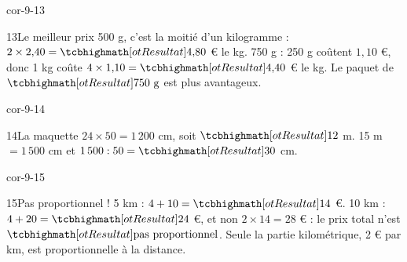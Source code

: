 \begin{blocLivre}{cor-9-13}\begin{corrige}{13}{Le meilleur prix}
500 g, c’est la moitié d’un kilogramme : $2\times2{,}40=\res{4{,}80}$ € le kg. 750 g : 250 g coûtent $1{,}10$ €, donc 1 kg coûte $4\times1{,}10=\res{4{,}40}$ € le kg. Le paquet de $\res{750\ \mathrm{g}}$ est plus avantageux.
\end{corrige}\end{blocLivre}
\begin{blocLivre}{cor-9-14}\begin{corrige}{14}{La maquette}
$24\times50=1\,200$ cm, soit $\res{12}$ m. 15 m $=1\,500$ cm et $1\,500:50=\res{30}$ cm.
\end{corrige}\end{blocLivre}
\begin{blocLivre}{cor-9-15}\begin{corrige}{15}{Pas proportionnel !}
5 km : $4+10=\res{14}$ €. 10 km : $4+20=\res{24}$ €, et non $2\times14=28$ € : le prix total n’est $\res{\text{pas proportionnel}}$. Seule la partie kilométrique, 2 € par km, est proportionnelle à la distance.
\end{corrige}\end{blocLivre}
